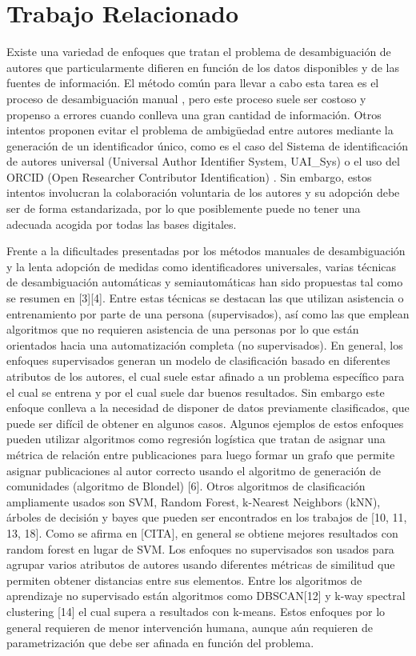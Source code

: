 \documentclass[conference]{IEEEtran}
\begin{document}
\section{Trabajo Relacionado}
Existe una variedad de enfoques que tratan el problema de desambiguación de autores que particularmente difieren en función de los datos disponibles y de las fuentes de información. El método común para llevar a cabo esta tarea es el proceso de desambiguación manual \cite{doi:10.1300/J115v22n04_01}, pero este proceso suele ser costoso y propenso a errores cuando conlleva una gran cantidad de información. Otros intentos proponen evitar el problema de ambigüedad entre autores  mediante la generación de un identificador único, como es el caso del Sistema de identificación de autores universal (Universal Author Identifier System, UAI\_Sys) \cite{Dervos2007TheUA} o el uso del ORCID (Open Researcher Contributor Identification) \cite{Haak2012ORCIDAS}. Sin embargo, estos intentos involucran la colaboración voluntaria  de los autores y su adopción debe ser de forma estandarizada, por lo que posiblemente puede no tener una adecuada acogida por todas las bases digitales. 

Frente a la dificultades presentadas por los métodos manuales de desambiguación y la lenta adopción de medidas como identificadores universales, varias técnicas de desambiguación automáticas y semiautomáticas  han sido propuestas tal como se resumen en [3][4]. Entre estas técnicas se destacan las que utilizan asistencia o entrenamiento  por parte de una persona (supervisados), así como las que emplean algoritmos que no requieren asistencia de una personas por lo que están orientados hacia una automatización completa (no supervisados). En general, los enfoques supervisados generan un modelo de clasificación  basado en diferentes atributos de los autores, el cual suele estar afinado a un problema específico para el cual se entrena y por el cual suele dar buenos resultados. Sin embargo este enfoque conlleva a la necesidad de disponer de datos previamente clasificados, que puede ser difícil de obtener en algunos casos. Algunos ejemplos de estos enfoques pueden utilizar algoritmos como  regresión logística que tratan de asignar una métrica de relación entre publicaciones para luego formar un grafo que permite asignar publicaciones al autor correcto usando el algoritmo de generación de comunidades (algoritmo de Blondel) [6]. Otros algoritmos de clasificación ampliamente usados son SVM, Random Forest, k-Nearest Neighbors (kNN), árboles de decisión y bayes que pueden ser encontrados en los trabajos de [10, 11, 13, 18]. Como se afirma en [CITA], en  general se obtiene mejores resultados con random forest en lugar de SVM. Los enfoques no supervisados son usados para agrupar varios atributos de autores usando diferentes métricas de similitud que permiten obtener distancias entre sus elementos. Entre los algoritmos de aprendizaje no supervisado están algoritmos como DBSCAN[12] y k-way spectral clustering [14] el cual supera a resultados con k-means. Estos enfoques por lo general requieren de menor intervención humana, aunque aún requieren de parametrización que debe ser afinada en función del problema.
\end{document}

